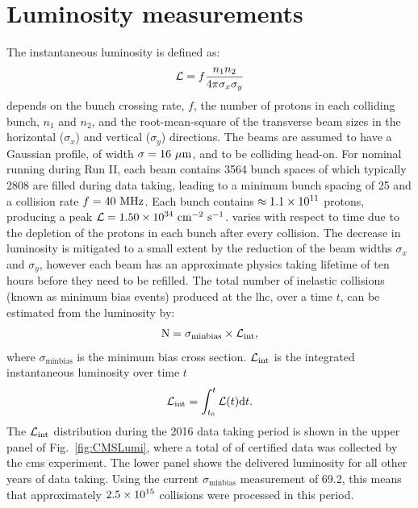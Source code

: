 \section{Luminosity measurements}
\label{sec:lumi}

The instantaneous luminosity is defined as:
\begin{equation}
\label{eq:InsLumi}
\mathcal{L} = f \frac{n_{1}n_{2}}{4\pi \sigma_{x} \sigma_{y}}
\end{equation}
\Lum{} depends on the bunch crossing rate, $f$, the number of protons in each colliding bunch, $n_{1}$ and $n_{2}$, and the root-mean-square of the transverse beam sizes in the horizontal ($\sigma_{x}$) and vertical ($\sigma_{y}$) directions. 
The beams are assumed to have a Gaussian profile, of width $\sigma=16\mathrm{~\mu m}^{}$, and to be colliding head-on.
For nominal running during Run II, each beam contains 3564 bunch spaces of which typically 2808 are filled during data taking, leading to a minimum bunch spacing of 25\ns{} and a collision rate $f=40\mathrm{~MHz}^{}$.
Each bunch contains $\approx 1.1\times \text{10}^\text{11}$ protons, producing a peak $\mathcal{L}=1.50\times \text{10}^\text{34}~\text{cm}^\text{$-$2}~\text{s}^\text{$-$1}$.
\Lum{} varies with respect to time due to the depletion of the protons in each bunch after every collision.
The decrease in luminosity is mitigated to a small extent by the reduction of the beam widths $\sigma_{x}$ and $\sigma_{y}$, however each beam has an approximate physics taking lifetime of ten hours before they need to be refilled.
The total number of inelastic collisions (known as minimum bias events) produced at the \acrshort{lhc}, over a time $t$, can be estimated from the luminosity by:
\begin{equation}
\label{eq:nEvent}
\text{N} = \sigma_{\text{minbias}}\times\mathcal{L}_{\text{int}}, 
\end{equation}
where $\sigma_{\text{minbias}}$ is the minimum bias cross section.
$\mathcal{L}_{\text{int}}$ is the integrated instantaneous luminosity over time $t$
\begin{equation}
\label{eq:IntLumi}
\mathcal{L}_{\text{int}} = \int^{t}_{t_{0}}\mathcal{L}(t)\text{d}t.
\end{equation}
The $\mathcal{L}_{\text{int}}$ distribution during the 2016 data taking period is shown in the upper panel of Fig.~\ref{fig:CMSLumi}, where a total of \Lumi{} of certified data was collected by the \acrshort{cms} experiment.
The lower panel shows the delivered luminosity for all other years of data taking.
Using the current $\sigma_{\text{minbias}}$ measurement of 69.2\mb{}, this means that approximately $2.5\times \text{10}^\text{15}$ collisions were processed in this period.

